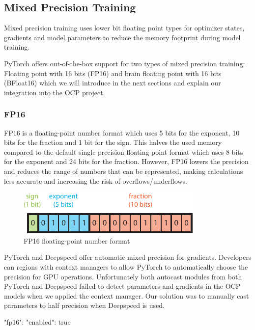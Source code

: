 \subsection{Mixed Precision Training}

Mixed precision training uses lower bit floating point types for optimizer states, gradients and model parameters to 
reduce the memory footprint during model training. 

PyTorch offers out-of-the-box support for two types of mixed precision training: Floating point with 16 bits (FP16) and 
brain floating point with 16 bits (BFloat16) which we will introduce in the next sections and explain our integration 
into the OCP project.

\subsubsection{FP16}

FP16 is a floating-point number format which uses 5 bits for the exponent, 10 bits for the fraction and 1 bit for the 
sign. This halves the used memory compared to the default single-precision floating-point format which uses 8 bits 
for the exponent and 24 bits for the fraction. However, FP16 lowers the precision and reduces the range of numbers 
that can be represented, making calculations less accurate and increasing the risk of overflows/underflows.

\begin{figure}[H]
    \centering
    \includegraphics{figures/mixed_precision/float16.pdf}
    \caption{FP16 floating-point number format}
\end{figure}

PyTorch and Deepspeed offer automatic mixed precision for gradients. Developers can regions with context managers 
to allow PyTorch to automatically choose the precision for GPU operations. Unfortunately both autocast modules from 
both PyTorch and Deepspeed failed to detect parameters and gradients in the OCP models when we applied the context 
manager. Our solution was to manually cast parameters to half precision when Deepspeed is used. 

\begin{json}
{
    "fp16": {
        "enabled": true
    }
}
\end{json}

